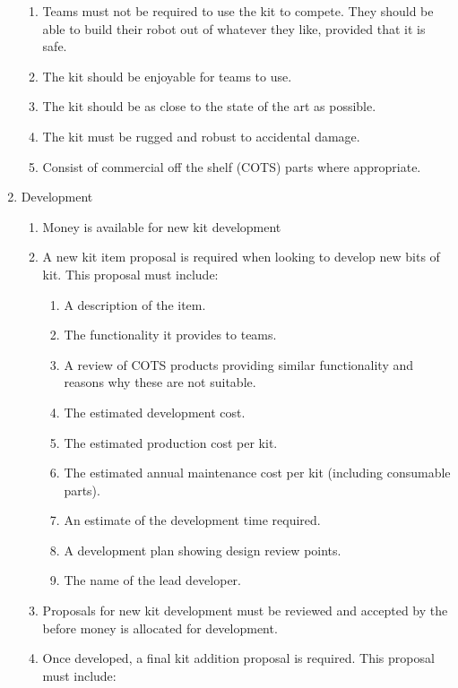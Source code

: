 \begin{enumerate}
\begin{enumerate}
    \item Teams must not be required to use the kit to compete.  They should be able to build their robot out of whatever they like, provided that it is safe.

    \item The kit should be enjoyable for teams to use.

    \item The kit should be as close to the state of the art as possible.

    \item The kit must be rugged and robust to accidental damage.
    \item{Consist of commercial off the shelf (COTS) parts where appropriate.}
  \end{enumerate}
\item Development
  \begin{enumerate}
    \item Money is available for new kit development
    \item A new kit item proposal is required when looking to develop new bits of kit. This proposal must include:
      \begin{enumerate}
        \item A description of the item.
        \item The functionality it provides to teams.
        \item A review of COTS products providing similar functionality and reasons why these are not suitable.
        \item The estimated development cost.
        \item The estimated production cost per kit.
        \item The estimated annual maintenance cost per kit (including consumable parts).
        \item An estimate of the development time required.
        \item A development plan showing design review points.
        \item The name of the lead developer.
      \end{enumerate}
    \item Proposals for new kit development must be reviewed and accepted by the  before money is allocated for development.
    \item Once developed, a final kit addition proposal is required. This proposal must include:
      \begin{enumerate}

\end{enumerate}
\end{enumerate}
\end{enumerate}
